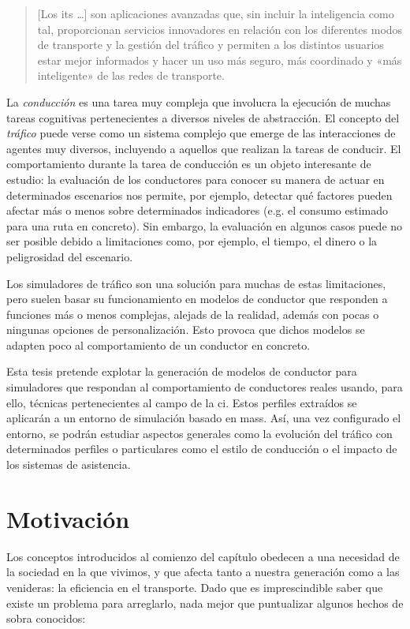 \blockquote{[Los \ac{its} \ldots] son aplicaciones avanzadas que, sin incluir la inteligencia como tal, proporcionan servicios innovadores en relación con los diferentes modos de transporte y la gestión del tráfico y permiten a los distintos usuarios estar mejor informados y hacer un uso más seguro, más coordinado y «más inteligente» de las redes de transporte.}

La \textit{conducción} es una tarea muy compleja que involucra la ejecución de muchas tareas cognitivas pertenecientes a diversos niveles de abstracción. El concepto del \textit{tráfico} puede verse como un sistema complejo que emerge de las interacciones de agentes muy diversos, incluyendo a aquellos que realizan la tareas de conducir. El comportamiento durante la tarea de conducción es un objeto interesante de estudio: la evaluación de los conductores para conocer su manera de actuar en determinados escenarios nos permite, por ejemplo, detectar qué factores pueden afectar más o menos sobre determinados indicadores (e.g. el consumo estimado para una ruta en concreto). Sin embargo, la evaluación en algunos casos puede no ser posible debido a limitaciones como, por ejemplo, el tiempo, el dinero o la peligrosidad del escenario.

Los simuladores de tráfico son una solución para muchas de estas limitaciones, pero suelen basar su funcionamiento en modelos de conductor que responden a funciones más o menos complejas, alejads de la realidad, además con pocas o ningunas opciones de personalización. Esto provoca que dichos modelos se adapten poco al comportamiento de un conductor en concreto.

Esta tesis pretende explotar la generación de modelos de conductor para simuladores que respondan al comportamiento de conductores reales usando, para ello, técnicas pertenecientes al campo de la \ac{ci}. Estos perfiles extraídos se aplicarán a un entorno de simulación basado en \acp{mas}. Así, una vez configurado el entorno, se podrán estudiar aspectos generales como la evolución del tráfico con determinados perfiles o particulares como el estilo de conducción o el impacto de los sistemas de asistencia.

\section{Motivación}

Los conceptos introducidos al comienzo del capítulo obedecen a una necesidad de la sociedad en la que vivimos, y que afecta tanto a nuestra generación como a las venideras: la eficiencia en el transporte. Dado que es imprescindible saber que existe un problema para arreglarlo, nada mejor que puntualizar algunos hechos de sobra conocidos:

